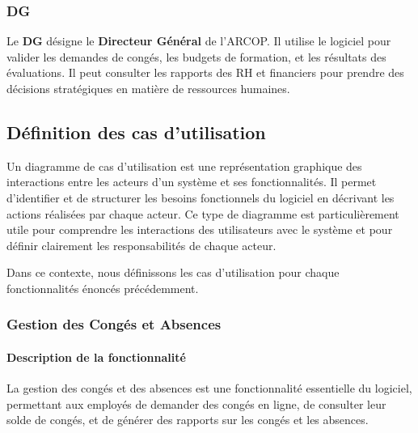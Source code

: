 \subsubsection{DG}
Le \textbf{DG} désigne le \textbf{Directeur Général} de l'\ac{ARCOP}. Il utilise le logiciel pour valider les demandes de congés, les budgets de formation, et les résultats des évaluations. Il peut consulter les rapports des \ac{RH} et financiers pour prendre des décisions stratégiques en matière de ressources humaines.


\subsection{D\'efinition des cas d'utilisation}

Un diagramme de cas d'utilisation est une représentation graphique des interactions entre les acteurs d'un système et ses fonctionnalités. Il permet d'identifier et de structurer les besoins fonctionnels du logiciel en décrivant les actions réalisées par chaque acteur. Ce type de diagramme est particulièrement utile pour comprendre les interactions des utilisateurs avec le système et pour définir clairement les responsabilités de chaque acteur.

Dans ce contexte, nous définissons les cas d'utilisation pour chaque fonctionnalités énoncés précédemment.
\subsubsection{Gestion des Congés et Absences}
\paragraph{Description de la fonctionnalité}
La gestion des congés et des absences est une fonctionnalité essentielle du logiciel, permettant aux employés de demander des congés en ligne, de consulter leur solde de congés, et de générer des rapports sur les congés et les absences.
